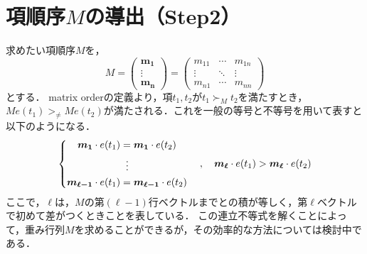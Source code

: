 \section{項順序$M$の導出（Step2）}
求めたい項順序$M$を，
$$
	M = \begin{pmatrix}
		\bm{m_1} \\
		\vdots \\
		\bm{m_n}
	\end{pmatrix}
	=
	\begin{pmatrix}
		m_{11} & \cdots & m_{1n} \\
		\vdots & \ddots & \vdots \\
		m_{n1} & \cdots & m_{nn}
	\end{pmatrix}
$$
とする．
matrix orderの定義より，項$t_1, t_2$が$t_1 \succ_M t_2$を満たすとき，$Me(t_1) >_{\ne} Me(t_2)$が満たされる．これを一般の等号と不等号を用いて表すと以下のようになる．
\begin{equation}
	\left\{
	\begin{aligned}
		\bm{m_1} \cdot e(t_1) &= \bm{m_1} \cdot e(t_2)\\
		&\;\; \vdots \\
		\bm{m_{\ell-1}} \cdot e(t_1) &= \bm{m_{\ell-1}} \cdot e(t_2)
	\end{aligned}
	\right.
	\quad
	,
	\quad \bm{m_{\ell}} \cdot e(t_1)> \bm{m_{\ell}} \cdot e(t_2) \notag
\end{equation}
ここで，$\ell$は，$M$の第$(\ell-1)$行ベクトルまでとの積が等しく，第$\ell$ベクトルで初めて差がつくときことを表している．
この連立不等式を解くことによって，重み行列$M$を求めることができるが，その効率的な方法については検討中である．


















